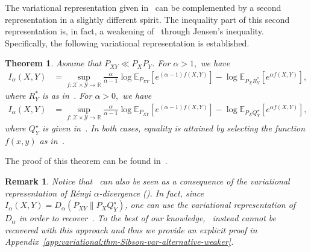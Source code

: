 \documentclass{article}
\newtheorem{theorem}{Theorem}
\numberwithin{theorem}{section}
\numberwithin{example}{section}
\newtheorem{remark}{Remark}
\numberwithin{remark}{section}
\numberwithin{definition}{section}
\newcommand{\E}{\mathbb{E}}
\newcommand{\X}{\mathcal{X}}
\begin{document}
The variational representation given in~ can be complemented by a second representation in a slightly different spirit. The inequality part of this second representation is, in fact, a weakening of~ through Jensen's inequality.
Specifically, the following variational representation is established.

\begin{theorem}\label{thm-Sibson-var-alternative-weaker}
Assume that $P_{XY}\ll P_XP_Y$. For $\alpha>1,$ we have 
 \begin{align}
    I_\alpha(X,Y) &= \sup_{f:\X\times\mathcal{Y}\to\mathbb{R}} \frac{\alpha}{\alpha-1} \log \E_{P_{XY}}\left[e^{(\alpha-1)f(X,Y)}\right] -  \log \E_{P_XR^*_Y}\left[e^{\alpha f(X,Y)}\right] ,\label{thm-Sibson-var-alternative-eq-largealpha-weaker}
\end{align}
where $R_Y^*$ is as in~.
For $\alpha>0,$ we have
\begin{align}
  I_\alpha(X,Y) &= \sup_{f:\X\times\mathcal{Y}\to\mathbb{R}} \frac{\alpha}{\alpha-1} \log \E_{P_{XY}}\left[e^{(\alpha-1) f(X,Y)}\right]-  \log \E_{P_XQ_Y^{\star}}\left[e^{\alpha f(X,Y)}\right] , \label{thm-Sibson-var-alternative-eq-smallalpha-weaker}
\end{align}
where $Q_Y^\star$ is given in~.
In both cases, equality is attained by selecting the function $f(x,y)$ as in~.
\end{theorem}

The proof of this theorem can be found in~.
\begin{remark}
    Notice that~ can also be seen as a consequence of the variational representation of R\'enyi $\alpha$-divergence (). In fact, since $I_\alpha(X,Y)=D_\alpha(P_{XY}\|P_XQ_Y^\star)$, one can use the variational representation of $D_\alpha$ in order to recover~. To the best of our knowledge,~ instead cannot be recovered with this approach and thus we provide an explicit proof in Appendix~\ref{app:variational:thm-Sibson-var-alternative-weaker}.
\end{remark}
\end{document}
